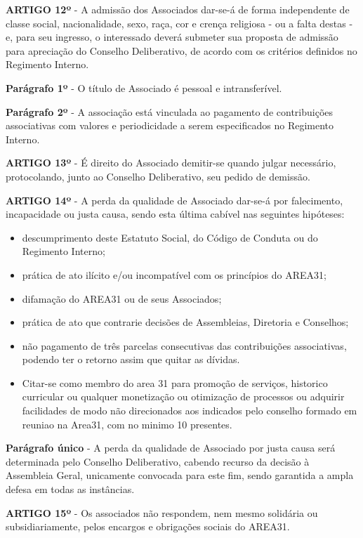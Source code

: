 \bigskip

\textbf{ARTIGO 12º} - A admissão dos Associados dar-se-á de forma 
independente de classe social, nacionalidade, sexo, raça, cor e crença 
religiosa - ou a falta destas - e, para seu ingresso, o interessado deverá 
submeter sua proposta de admissão para apreciação do Conselho Deliberativo, 
de acordo com os critérios definidos no Regimento Interno.

\bigskip

\textbf{Parágrafo 1º} - O título de Associado é pessoal e intransferível.

\bigskip

\textbf{Parágrafo 2º} - A associação está vinculada ao pagamento de 
contribuições associativas com valores e periodicidade a serem especificados 
no Regimento Interno.

\bigskip

\textbf{ARTIGO 13º} - É direito do Associado demitir-se quando julgar 
necessário, protocolando, junto ao Conselho Deliberativo, 
seu pedido de demissão.

\bigskip

\textbf{ARTIGO 14º} - A perda da qualidade de Associado dar-se-á por 
falecimento, incapacidade ou justa causa, sendo esta última cabível 
nas seguintes hipóteses:

\begin{itemize}
    \item descumprimento deste Estatuto Social, do Código de Conduta ou do 
        Regimento Interno;
    \item prática de ato ilícito e/ou incompatível com os princípios do AREA31;
    \item difamação do AREA31 ou de seus Associados;
    \item prática de ato que contrarie decisões de Assembleias, 
        Diretoria e Conselhos;
    \item não pagamento de três parcelas consecutivas das contribuições 
        associativas, podendo ter o retorno assim que quitar as dívidas. 
    \item Citar-se como membro do area 31 para promoção de serviços, 
        historico curricular ou qualquer monetização ou otimização de 
        processos ou adquirir facilidades de modo não direcionados aos 
        indicados pelo conselho formado em reuniao na Area31, 
        com no minimo 10 presentes.
\end{itemize}

\textbf{Parágrafo único} - A perda da qualidade de Associado por justa causa 
será determinada pelo Conselho Deliberativo, cabendo recurso da decisão à 
Assembleia Geral, unicamente convocada para este fim, sendo garantida a 
ampla defesa em todas as instâncias.

\bigskip

\textbf{ARTIGO 15º} - Os associados não respondem, nem  mesmo solidária ou 
subsidiariamente, pelos encargos e obrigações sociais do AREA31.

